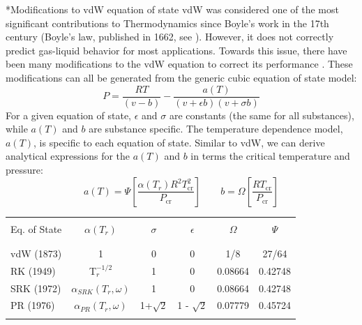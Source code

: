 \documentclass[11pt]{article}
\makeatletter
\theoremstyle{definition}
\renewcommand\subsection{\@startsection
	{subsection}{2}{0mm}
	{-0.05in}
	{0.5\baselineskip}
	{\normalfont\normalsize\bfseries}}
\makeatother
\begin{document}
\subsection*{Modifications to vdW equation of state}
vdW was considered one of the most significant contributions to Thermodynamics since Boyle's work in the 17th century (Boyle's law, published in 1662, see \cite{West:2005aa}).
However, it does not correctly predict gas-liquid behavior for most applications.
Towards this issue, there have been many modifications to the vdW equation to correct its performance \cite{Valderrama2003}.
These modifications can all be generated from the generic cubic equation of state model:
\begin{equation}\label{eq:generic-model}
P = \frac{RT}{\left(v-b\right)}-\frac{a(T)}{\left(v+\epsilon b\right)\left(v+\sigma b\right)}
\end{equation}
For a given equation of state, $\epsilon$ and $\sigma$ are constants (the same for all substances), while
$a(T)$ and $b$ are substance specific. The temperature dependence model, $a(T)$, is specific to each equation of state.
Similar to vdW, we can derive analytical expressions for the $a(T)$ and $b$ in terms the critical temperature and pressure:
\begin{equation}
	a\left(T\right) = \Psi\left[\frac{\alpha\left(T_{r}\right)R^{2}T^{2}_{\mathrm{cr}}}{P_{\mathrm{cr}}}\right]\qquad
	b = \Omega\left[\frac{RT_{\mathrm{cr}}}{P_{\mathrm{cr}}}\right]
\end{equation}

\begin{center}
\begin{tabular}{lccccc}
	\hline\\
	Eq. of State & $\alpha\left(T_{r}\right)$ & $\sigma$ & $\epsilon$ & $\Omega$ & $\Psi$ \\\\
	\hline\\

	vdW (1873) & 1 & 0 & 0 & 1/8 & 27/64 \\
	RK (1949) & T$_{r}^{-1/2}$ & 1 & 0 & 0.08664 & 0.42748 \\
	SRK (1972) & $\alpha_{SRK}\left(T_{r},\omega\right)$ & 1 & 0 & 0.08664 & 0.42748 \\
	PR (1976) & $\alpha_{PR}\left(T_{r},\omega\right)$ & 1+$\sqrt{2}$ & 1 - $\sqrt{2}$ & 0.07779 & 0.45724 \\\\

	\hline

\end{tabular}
\end{center}
\end{document}
